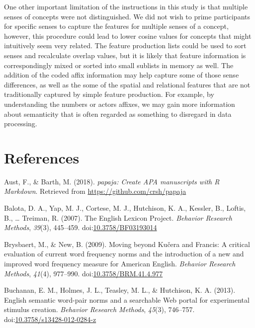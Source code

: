 \documentclass[english,man]{apa6}
\theoremstyle{definition}
\theoremstyle{definition}
\theoremstyle{definition}
\theoremstyle{remark}
\begin{document}
One other important limitation of the instructions in this study is that
multiple senses of concepts were not distinguished. We did not wish to
prime participants for specific senses to capture the features for
multiple senses of a concept, however, this procedure could lead to
lower cosine values for concepts that might intuitively seem very
related. The feature production lists could be used to sort senses and
recalculate overlap values, but it is likely that feature information is
correspondingly mixed or sorted into small sublists in memory as well.
The addition of the coded affix information may help capture some of
those sense differences, as well as the some of the spatial and
relational features that are not traditionally captured by simple
feature production. For example, by understanding the numbers or actors
affixes, we may gain more information about semanticity that is often
regarded as something to disregard in data processing.

\newpage

\section{References}\label{references}

\setlength{\parindent}{-0.5in} \setlength{\leftskip}{0.5in}

\hypertarget{refs}{}
\hypertarget{ref-R-papaja}{}
Aust, F., \& Barth, M. (2018). \emph{papaja: Create APA manuscripts with
R Markdown}. Retrieved from \url{https://github.com/crsh/papaja}

\hypertarget{ref-Balota2007}{}
Balota, D. A., Yap, M. J., Cortese, M. J., Hutchison, K. A., Kessler,
B., Loftis, B., \ldots{} Treiman, R. (2007). The English Lexicon
Project. \emph{Behavior Research Methods}, \emph{39}(3), 445--459.
doi:\href{https://doi.org/10.3758/BF03193014}{10.3758/BF03193014}

\hypertarget{ref-Brysbaert2009}{}
Brysbaert, M., \& New, B. (2009). Moving beyond Kučera and Francis: A
critical evaluation of current word frequency norms and the introduction
of a new and improved word frequency measure for American English.
\emph{Behavior Research Methods}, \emph{41}(4), 977--990.
doi:\href{https://doi.org/10.3758/BRM.41.4.977}{10.3758/BRM.41.4.977}

\hypertarget{ref-Buchanan2013}{}
Buchanan, E. M., Holmes, J. L., Teasley, M. L., \& Hutchison, K. A.
(2013). English semantic word-pair norms and a searchable Web portal for
experimental stimulus creation. \emph{Behavior Research Methods},
\emph{45}(3), 746--757.
doi:\href{https://doi.org/10.3758/s13428-012-0284-z}{10.3758/s13428-012-0284-z}
\end{document}
